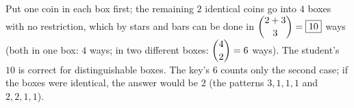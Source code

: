 Put one coin in each box first; the remaining $2$ identical coins go into $4$ boxes with no restriction, which by stars and bars can be done in $\dbinom{2+3}{3}=\boxed{10}$ ways (both in one box: $4$ ways; in two different boxes: $\dbinom42=6$ ways). The student's $10$ is correct for distinguishable boxes. The key's $6$ counts only the second case; if the boxes were identical, the answer would be $2$ (the patterns $3,1,1,1$ and $2,2,1,1$).
